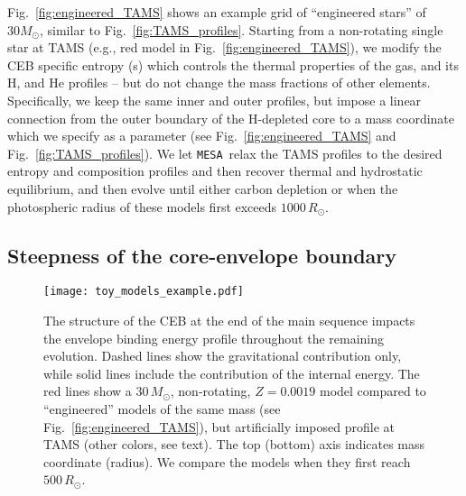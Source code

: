 \documentclass[twocolumn,twocolappendix,trackchanges]{aastex63}
\newcommand{\code}[1]{\texttt{#1}}
\newcommand{\mesa}{\code{MESA}}
\DeclareRobustCommand{\Figref}[1]{Fig.~\ref{#1}}
\begin{document}
\Figref{fig:engineered_TAMS} shows an example grid of ``engineered
stars'' of $30M_\odot$, similar to \Figref{fig:TAMS_profiles}.
Starting from a non-rotating single star at TAMS (e.g., red model in
\Figref{fig:engineered_TAMS}), we modify the CEB specific entropy (s)
which controls the thermal properties of the gas, and its H, and He
profiles -- but do not change the mass fractions of other elements.
Specifically, we keep the same inner and outer profiles, but impose a
linear connection from the outer boundary of the H-depleted core to a
mass coordinate which we specify as a parameter (see
\Figref{fig:engineered_TAMS} and \Figref{fig:TAMS_profiles}). We let \mesa\ relax
the TAMS profiles to the desired entropy and composition profiles and
then recover thermal and hydrostatic equilibrium, and then evolve
until either carbon depletion or when the photospheric radius of these
models first exceeds
$1000\,R_\odot$.



\subsection{Steepness of the core-envelope boundary}
\label{sec:eng_examples}


\begin{figure}[htbp]
  \centering
  \texttt{[image: toy\_models\_example.pdf]}
  \caption{The structure of the CEB at the end of the main sequence
    impacts the envelope binding energy profile throughout the
    remaining evolution. Dashed lines show the gravitational
    contribution only, while solid lines include the contribution of
    the internal energy. The red lines show a $30\,M_\odot$,
    non-rotating, $Z=0.0019$ model compared to ``engineered'' models
    of the same mass (see \Figref{fig:engineered_TAMS}), but
    artificially imposed profile at TAMS (other colors, see text). The
    top (bottom) axis indicates mass coordinate (radius). We compare
    the models when they first reach $500\,R_\odot$.}
  \label{fig:toy_models_example}
\end{figure}
\end{document}
